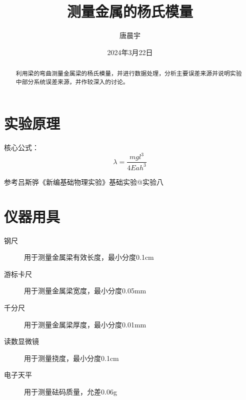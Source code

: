 \documentclass[12pt, a4paper]{ctexart}
\makeatletter
\newcommand{\Rmnum}[1]{\expandafter\@slowromancap\romannumeral #1@}
\makeatother
\begin{document}
\title{测量金属的杨氏模量}
\author{唐晨宇 }
\date{2024年3月22日}

\maketitle

\begin{abstract}
	利用梁的弯曲测量金属梁的杨氏模量，并进行数据处理，分析主要误差来源并说明实验中部分系统误差来源，并作较深入的讨论。
\end{abstract}
	
\tableofcontents

\clearpage

\pagestyle{headings}

\section{实验原理}
核心公式：
\[
	\lambda = \frac{mgl^3}{4Eah^3}
\]

参考吕斯骅《新编基础物理实验》基础实验\Rmnum{1}\quad 实验八

\section{仪器用具}
\begin{description}
	\item[钢尺] 用于测量金属梁有效长度，最小分度0.1cm
	\item[游标卡尺] 用于测量金属梁宽度，最小分度0.05mm
	\item[千分尺] 用于测量金属梁厚度，最小分度0.01mm
	\item[读数显微镜] 用于测量挠度，最小分度0.1cm
	\item[电子天平] 用于测量砝码质量，允差0.06g
\end{description}
\end{document}

